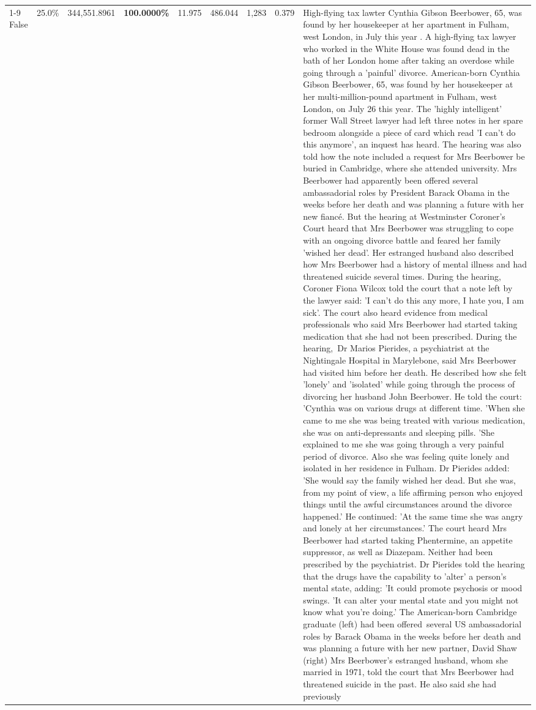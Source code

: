 \begin{table}[H]
\begin{tabular}{lllrlllll}
\cline{1-9}
False & 25.0\% & 344,551.8961 & \bfseries \color{red} 100.0000\% & 11.975 & 486.044 & 1,283 & 0.379 & High-flying tax lawter Cynthia Gibson Beerbower, 65, was found by her housekeeper at her apartment in Fulham, west London, in July this year . A high-flying tax lawyer who worked in the White House was found dead in the bath of her London home after taking an overdose while going through a 'painful' divorce. American-born Cynthia Gibson Beerbower, 65, was found by her housekeeper at her multi-million-pound apartment in Fulham, west London, on July 26 this year. The 'highly intelligent' former Wall Street lawyer had left three notes in her spare bedroom alongside a piece of card which read 'I can't do this anymore', an inquest has heard. The hearing was also told how the note included a request for Mrs Beerbower be buried in Cambridge, where she attended university. Mrs Beerbower had apparently been offered several ambassadorial roles by President Barack Obama in the weeks before her death and was planning a future with her new fiancé. But the hearing at Westminster Coroner's Court heard that Mrs Beerbower was struggling to cope with an ongoing divorce battle and feared her family 'wished her dead'. Her estranged husband also described how Mrs Beerbower had a history of mental illness and had threatened suicide several times. During the hearing, Coroner Fiona Wilcox told the court that a note left by the lawyer said: 'I can't do this any more, I hate you, I am sick'. The court also heard evidence from medical professionals who said Mrs Beerbower had started taking medication that she had not been prescribed. During the hearing, Dr Marios Pierides, a psychiatrist at the Nightingale Hospital in Marylebone, said Mrs Beerbower had visited him before her death. He described how she felt 'lonely' and 'isolated' while going through the process of divorcing her husband John Beerbower. He told the court: 'Cynthia was on various drugs at different time. 'When she came to me she was being treated with various medication, she was on anti-depressants and sleeping pills. 'She explained to me she was going through a very painful period of divorce. Also she was feeling quite lonely and isolated in her residence in Fulham. Dr Pierides added: 'She would say the family wished her dead. But she was, from my point of view, a life affirming person who enjoyed things until the awful circumstances around the divorce happened.' He continued: 'At the same time she was angry and lonely at her circumstances.' The court heard Mrs Beerbower had started taking Phentermine, an appetite suppressor, as well as Diazepam. Neither had been prescribed by the psychiatrist. Dr Pierides told the hearing that the drugs have the capability to 'alter' a person's mental state, adding: 'It could promote psychosis or mood swings. 'It can alter your mental state and you might not know what you're doing.' The American-born Cambridge graduate (left) had been offered several US ambassadorial roles by Barack Obama in the weeks before her death and was planning a future with her new partner, David Shaw (right) Mrs Beerbower's estranged husband, whom she married in 1971, told the court that Mrs Beerbower had threatened suicide in the past. He also said she had previously 
\end{tabular}
\end{table}
